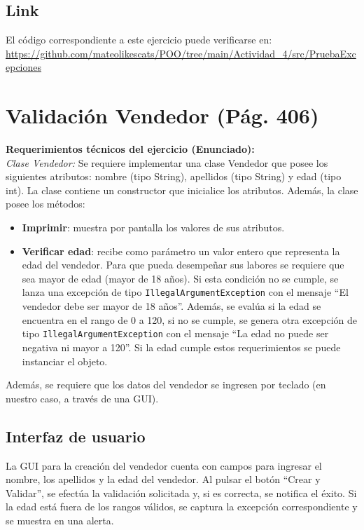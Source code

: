 \documentclass[a4paper,11pt]{article}
\begin{document}
\subsection{Link}
El código correspondiente a este ejercicio puede verificarse en:
\url{https://github.com/mateolikescats/POO/tree/main/Actividad_4/src/PruebaExcepciones}

\newpage

\section{Validación Vendedor (Pág. 406)}
\textbf{Requerimientos técnicos del ejercicio (Enunciado):}\\
\textit{Clase Vendedor:} Se requiere implementar una clase Vendedor que posee los siguientes atributos: nombre (tipo String), apellidos (tipo String) y edad (tipo int). La clase contiene un constructor que inicialice los atributos. Además, la clase posee los métodos:
\begin{itemize}
    \item \textbf{Imprimir}: muestra por pantalla los valores de sus atributos.
    \item \textbf{Verificar edad}: recibe como parámetro un valor entero que representa la edad del vendedor. Para que pueda desempeñar sus labores se requiere que sea mayor de edad (mayor de 18 años). Si esta condición no se cumple, se lanza una excepción de tipo \texttt{IllegalArgumentException} con el mensaje ``El vendedor debe ser mayor de 18 años''. Además, se evalúa si la edad se encuentra en el rango de 0 a 120, si no se cumple, se genera otra excepción de tipo \texttt{IllegalArgumentException} con el mensaje ``La edad no puede ser negativa ni mayor a 120''. Si la edad cumple estos requerimientos se puede instanciar el objeto.
\end{itemize}
Además, se requiere que los datos del vendedor se ingresen por teclado (en nuestro caso, a través de una GUI).

\subsection{Interfaz de usuario}
La GUI para la creación del vendedor cuenta con campos para ingresar el nombre, los apellidos y la edad del vendedor. Al pulsar el botón ``Crear y Validar'', se efectúa la validación solicitada y, si es correcta, se notifica el éxito. Si la edad está fuera de los rangos válidos, se captura la excepción correspondiente y se muestra en una alerta.
\end{document}
